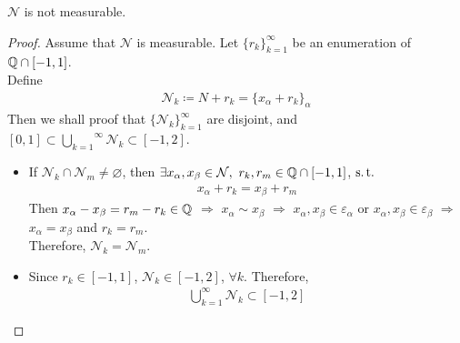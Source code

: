 	\begin{thm}\label{thm 1.5.1}
		$\mathcal{N}$ is not measurable.
		
		\vspace{2em}
		\begin{proof}
			Assume that $\mathcal{N}$ is measurable. Let $\{ r_k \}_{k = 1}^{\infty}$ be an enumeration of $\mathbb{Q} \cap [-1 , 1]$.\\
			Define
			\begin{align}
				\mathcal{N}_k \coloneqq N + r_k = \{ x_\alpha + r_k \}_{\alpha}
			\end{align}
			Then we shall proof that $\{ \mathcal{N}_k \}_{k = 1}^{\infty}$ are disjoint, and $[0 , 1] \subset \overset{\infty}{\underset{k = 1}{\bigcup}}{\mathcal{N}_k} \subset [-1 , 2]$.
			
			\begin{itemize}
				\item If $\mathcal{N}_k \cap \mathcal{N}_m \neq \varnothing$, then $\exists x_\alpha , x_\beta \in \mathcal{N} , \,\, r_k , r_m \in \mathbb{Q} \cap [-1 , 1]$, $\operatorname{s.t.}$
				\begin{align}
					x_\alpha + r_k = x_\beta + r_m
				\end{align}
				Then $x_\alpha - x_\beta = r_m - r_k \in \mathbb{Q}$ $\Rightarrow$ $x_\alpha \sim x_\beta$ $\Rightarrow$ $x_\alpha , x_\beta \in \varepsilon_{\alpha}$ or $x_\alpha , x_\beta \in \varepsilon_\beta$ $\Rightarrow$ $x_\alpha = x_\beta$ and $r_k = r_m$.\\
				Therefore, $\mathcal{N}_k = \mathcal{N}_m$.
				
				\item Since $r_k \in [-1 , 1]$, $\mathcal{N}_k \in [-1 , 2]$, $\forall k$. Therefore,
				\begin{align}
					\bigcup_{k = 1}^{\infty}{\mathcal{N}_k} \subset [-1 , 2]
				\end{align}
			

\end{itemize}
\end{proof}
\end{thm}
